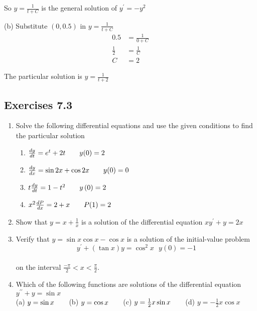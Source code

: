 So $y =\frac{1}{t +C}$ is the general solution of $y^{ \prime } = -y^{2}$ 

(b) Substitute $\left (0 ,0.5\right )$ in $y =\frac{1}{t +C}$
\begin{align*}0.5 &    = \frac{1}{0 +C} \\
\frac{1}{2} &    = \frac{1}{C} \\
C &    = 2\end{align*}

The particular solution is $y =\frac{1}{t +2}$ 

\subsection{Exercises 7.3}
\begin{enumerate}
\item Solve the following differential equations and use the given conditions to find the particular solution 


\begin{enumerate}
\item $\frac{d y}{d t} =e^{t} +2 t\text{\quad \quad }y (0) =2$ 

\item $\frac{d y}{d x} =\sin  2 x +\cos  2 x\text{\quad \quad }y (0) =0$ 

\item $t \frac{d y}{d t} =1 -t^{2}\text{\quad \quad }y \left (0\right ) =2$ 

\item $x^{2} \frac{d P}{d x} =2 +x\text{\quad \quad }P (1) =2$ \end{enumerate}


\item Show that $y =x +\frac{1}{x}$ is a solution of the differential equation $x y^{ \prime } +y =2 x$ 

\item Verify that $y =\sin  x \cos  x -\cos  x$ is a solution of the initial-value problem
\begin{equation*}y^{ \prime } +\left (\tan  x\right ) y =\cos ^{2} x\text{\  \  \  \  \  \  \  \  }y (0) = -1
\end{equation*} \\\relax on the interval $\frac{ -\pi }{2} <x <\frac{\pi }{2}\text{.}$ 

\item Which of the following functions are solutions of the differential
equation $y^{ \prime  \prime } +y =\sin  x$ \\\relax (a)  $y =\sin  x\text{\quad \quad }$(b)  $y =\cos  x\text{\quad \quad }$(c)  $y =\frac{1}{2} x \sin  x\text{\quad \quad }$(d)  $y = -\frac{1}{2} x \cos  x$ 


\end{enumerate}
